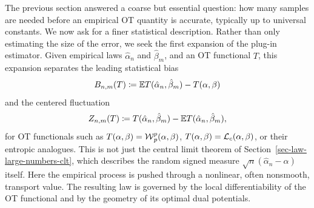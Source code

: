The previous section answered a coarse but essential question: how many samples are needed before an empirical OT quantity is accurate, typically up to universal constants.  We now ask for a finer statistical description.  Rather than only estimating the size of the error, we seek the first expansion of the plug-in estimator.  Given empirical laws \(\hat\alpha_n\) and \(\hat\beta_m\), and an OT functional \(T\), this expansion separates the leading statistical bias
\[
	B_{n,m}(T)
	\coloneqq
	\mathbb{E} T(\hat\alpha_n,\hat\beta_m)-T(\alpha,\beta)
\]
and the centered fluctuation
\[
	Z_{n,m}(T)
	\coloneqq
	T(\hat\alpha_n,\hat\beta_m)-\mathbb{E} T(\hat\alpha_n,\hat\beta_m),
\]
for OT functionals such as \(T(\alpha,\beta)=\operatorname{\mathcal{W}}_p^p(\alpha,\beta)\), \(T(\alpha,\beta)=\mathcal{L}_c(\alpha,\beta)\), or their entropic analogues.  This is not just the central limit theorem of Section~\ref{sec-law-large-numbers-clt}, which describes the random signed measure \(\sqrt n(\hat\alpha_n-\alpha)\) itself.  Here the empirical process is pushed through a nonlinear, often nonsmooth, transport value.  The resulting law is governed by the local differentiability of the OT functional and by the geometry of its optimal dual potentials.

